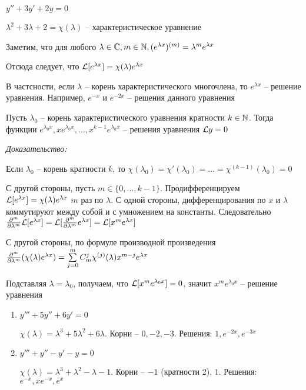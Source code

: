 \documentclass[12pt]{article}
\begin{document}
\begin{Example}{}
    $y'' + 3y' + 2y = 0$

    $\lambda^2 + 3\lambda + 2 = \chi(\lambda)$ -- характеристическое уравнение 

    Заметим, что для любого $\lambda \in \mathbb C, m \in \mathbb N, (e^{\lambda x})^{(m)} = \lambda^me^{\lambda x}$
    
    Отсюда следует, что $\mathcal{L}[e^{\lambda x}] = \chi(\lambda)e^{\lambda x}$

    В частсности, если $\lambda$ -- корень характеристического многочлена, то $e^{\lambda x}$ -- решение уравнения. Например, $e^{-x}$ и $e^{-2x}$ -- решения данного уравнения
\end{Example}

\begin{theo}{}
    Пусть $\lambda_0$ -- корень характеристического уравнения кратности $k \in \mathbb N$. Тогда функции $e^{\lambda_0x}, xe^{\lambda_0x}, \ldots, x^{k - 1}e^{\lambda_0x}$ -- решения уравнения $\mathcal{L} y = 0$ 
\end{theo}

\textit{Доказательство:}

Если $\lambda_0$ -- корень кратности $k$, то $\chi(\lambda_0) = \chi'(\lambda_0) = \ldots = \chi^{(k - 1)}(\lambda_0) = 0$

С другой стороны, пусть $m \in \{0, \ldots, k - 1\}$. Продифференцируем $\mathcal{L}[e^{\lambda x}] = \chi(\lambda)e^{\lambda x}$ $m$ раз по $\lambda$. С одной стороны, дифференцирования по $x$ и $\lambda$ коммутируют между собой и с умножением на константы. Следовательно $\frac{\partial ^m}{\partial \lambda^m}\mathcal{L}[e^{\lambda x}] = \mathcal{L}[\frac{\partial ^m}{\partial \lambda^m}e^{\lambda x}] = \mathcal{L}[x^me^{\lambda x}]$

С другой стороны, по формуле производной произведения $\frac{\partial ^m}{\partial \lambda^m}(\chi(\lambda)e^{\lambda x}) = \sum\limits_{j = 0}^m C_m^j\chi^{(j)}(\lambda) x^{m - j}e^{\lambda x}$

Подставляя $\lambda = \lambda_0$, получаем, что $\mathcal{L}[x^me^{\lambda_0x}] = 0$, значит $x^me^{\lambda_0x}$ -- решение уравнения

\begin{Example}{}
    \begin{enumerate}
        \item $y''' + 5y'' + 6y' = 0$
        
        $\chi(\lambda) = \lambda^3 + 5\lambda^2 + 6\lambda$. Корни -- $0, -2, -3$. Решения: $1, e^{-2x}, e^{-3x}$

        \item $y''' + y'' - y' - y = 0$
        
        $\chi(\lambda) = \lambda^3 + \lambda^2 - \lambda - 1$. Корни -- $-1$ (кратности 2), $1$. Решения: $e^{-x}, xe^{-x}, e^x$
    \end{enumerate}
\end{Example}
\end{document}
